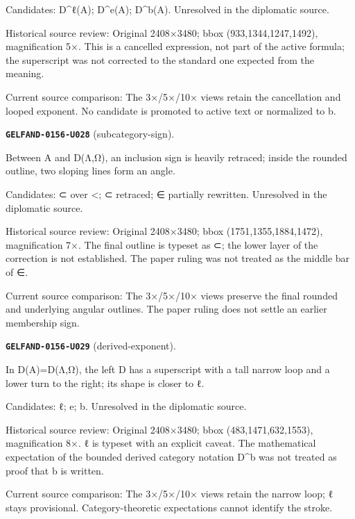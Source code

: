 Candidates: D\textasciicircum{}ℓ(A); D\textasciicircum{}e(A); D\textasciicircum{}b(A). Unresolved in the diplomatic source.\par
Historical source review: Original 2408×3480; bbox (933,1344,1247,1492), magnification 5×. This is a cancelled expression, not part of the active formula; the superscript was not corrected to the standard one expected from the meaning.\par
Current source comparison: The 3×/5×/10× views retain the cancellation and looped exponent. No candidate is promoted to active text or normalized to b.\par\medskip
\par\noindent\leavevmode{}\label{GELFAND-0156-U028}\label{GELFAND-P001444:subcategory-sign}\textbf{\texttt{GELFAND-0156-U028}} (subcategory-sign).\nopagebreak[4]\par
Between A and D(Λ,Ω), an inclusion sign is heavily retraced; inside the rounded outline, two sloping lines form an angle.\par
Candidates: ⊂ over <; ⊂ retraced; ∈ partially rewritten. Unresolved in the diplomatic source.\par
Historical source review: Original 2408×3480; bbox (1751,1355,1884,1472), magnification 7×. The final outline is typeset as ⊂; the lower layer of the correction is not established. The paper ruling was not treated as the middle bar of ∈.\par
Current source comparison: The 3×/5×/10× views preserve the final rounded and underlying angular outlines. The paper ruling does not settle an earlier membership sign.\par\medskip
\par\noindent\leavevmode{}\label{GELFAND-0156-U029}\label{GELFAND-P001444:derived-exponent}\textbf{\texttt{GELFAND-0156-U029}} (derived-exponent).\nopagebreak[4]\par
In D(A)=D(Λ,Ω), the left D has a superscript with a tall narrow loop and a lower turn to the right; its shape is closer to ℓ.\par
Candidates: ℓ; e; b. Unresolved in the diplomatic source.\par
Historical source review: Original 2408×3480; bbox (483,1471,632,1553), magnification 8×. ℓ is typeset with an explicit caveat. The mathematical expectation of the bounded derived category notation D\textasciicircum{}b was not treated as proof that b is written.\par
Current source comparison: The 3×/5×/10× views retain the narrow loop; ℓ stays provisional. Category-theoretic expectations cannot identify the stroke.\par\medskip
